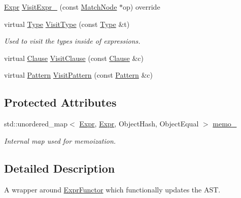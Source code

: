 \begin{DoxyCompactItemize}
\item 
\hyperlink{namespacetvm_1_1relay_a5b84e3790f89bb3fad5c7911eeb99531}{Expr} \hyperlink{classtvm_1_1relay_1_1ExprMutator_a927deef048b9b870193117c09567c767}{Visit\+Expr\+\_\+} (const \hyperlink{classtvm_1_1relay_1_1MatchNode}{Match\+Node} $\ast$op) override
\item 
virtual \hyperlink{namespacetvm_1_1relay_a661d95f170bca230773914caeef3fe52}{Type} \hyperlink{classtvm_1_1relay_1_1ExprMutator_ab4db31bc25fab94a92283b7291f1c178}{Visit\+Type} (const \hyperlink{namespacetvm_1_1relay_a661d95f170bca230773914caeef3fe52}{Type} \&t)
\begin{DoxyCompactList}\small\item\em Used to visit the types inside of expressions. \end{DoxyCompactList}\item 
virtual \hyperlink{classtvm_1_1relay_1_1Clause}{Clause} \hyperlink{classtvm_1_1relay_1_1ExprMutator_ae24134355b0e8c77aaab58c28a94202a}{Visit\+Clause} (const \hyperlink{classtvm_1_1relay_1_1Clause}{Clause} \&c)
\item 
virtual \hyperlink{classtvm_1_1relay_1_1Pattern}{Pattern} \hyperlink{classtvm_1_1relay_1_1ExprMutator_a18cefc9bf699954cba7546f914779415}{Visit\+Pattern} (const \hyperlink{classtvm_1_1relay_1_1Pattern}{Pattern} \&c)
\end{DoxyCompactItemize}
\subsection*{Protected Attributes}
\begin{DoxyCompactItemize}
\item 
std\+::unordered\+\_\+map$<$ \hyperlink{namespacetvm_1_1relay_a5b84e3790f89bb3fad5c7911eeb99531}{Expr}, \hyperlink{namespacetvm_1_1relay_a5b84e3790f89bb3fad5c7911eeb99531}{Expr}, Object\+Hash, Object\+Equal $>$ \hyperlink{classtvm_1_1relay_1_1ExprMutator_a68f3d44397b6070a2ed39f8425b36d3b}{memo\+\_\+}
\begin{DoxyCompactList}\small\item\em Internal map used for memoization. \end{DoxyCompactList}\end{DoxyCompactItemize}


\subsection{Detailed Description}
A wrapper around \hyperlink{classtvm_1_1relay_1_1ExprFunctor}{Expr\+Functor} which functionally updates the A\+ST. 


